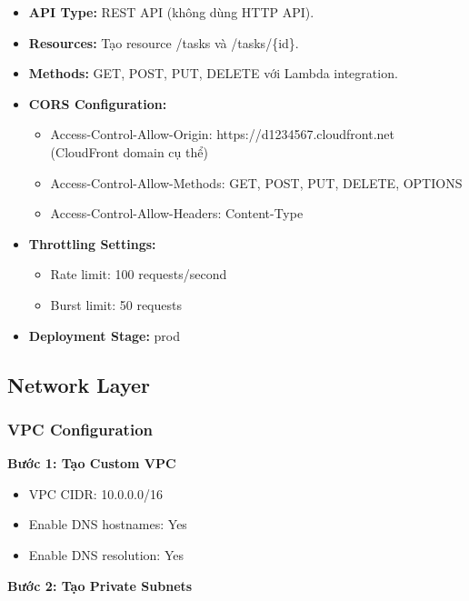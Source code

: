\begin{itemize}
    \item \textbf{API Type:} REST API (không dùng HTTP API).
    \item \textbf{Resources:} Tạo resource /tasks và /tasks/\{id\}.
    \item \textbf{Methods:} GET, POST, PUT, DELETE với Lambda integration.
    \item \textbf{CORS Configuration:}
    \begin{itemize}
        \item Access-Control-Allow-Origin: https://d1234567.cloudfront.net (CloudFront domain cụ thể)
        \item Access-Control-Allow-Methods: GET, POST, PUT, DELETE, OPTIONS
        \item Access-Control-Allow-Headers: Content-Type
    \end{itemize}
    \item \textbf{Throttling Settings:}
    \begin{itemize}
        \item Rate limit: 100 requests/second
        \item Burst limit: 50 requests
    \end{itemize}
    \item \textbf{Deployment Stage:} prod
\end{itemize}

\subsection{Network Layer}
\label{ssec:network_impl}

\subsubsection{VPC Configuration}

\textbf{Bước 1: Tạo Custom VPC}

\begin{itemize}
    \item VPC CIDR: 10.0.0.0/16
    \item Enable DNS hostnames: Yes
    \item Enable DNS resolution: Yes
\end{itemize}

\textbf{Bước 2: Tạo Private Subnets}

